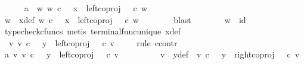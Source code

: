 \begin{isabellebody}
\ \ \ \ \isamarkupfalse%
\ a{}{\isacharcolon}{\kern0pt}\ {\isachardoublequoteopen}{\isasymexists}\ w{\isachardot}{\kern0pt}\ w\ {\isasymin}\isactrlsub c\ {\isasymone}\ {\isasymand}\ x\ {\isacharequal}{\kern0pt}\ left{\isacharunderscore}{\kern0pt}coproj\ {\isasymone}\ {\isasymone}\ {\isasymcirc}\isactrlsub c\ w{\isachardoublequoteclose}\isanewline
\ \ \ \ \isamarkupfalse%
\ \isamarkupfalse%
\ w\ \ x{\isacharunderscore}{\kern0pt}def{\isacharcolon}{\kern0pt}\ {\isachardoublequoteopen}w\ {\isasymin}\isactrlsub c\ {\isasymone}\ {\isasymand}\ x\ {\isacharequal}{\kern0pt}\ left{\isacharunderscore}{\kern0pt}coproj\ {\isasymone}\ {\isasymone}\ {\isasymcirc}\isactrlsub c\ w{\isachardoublequoteclose}\isanewline
\ \ \ \ \ \ \isamarkupfalse%
\ blast\isanewline
\ \ \ \ \isamarkupfalse%
\ \isamarkupfalse%
\ {\isachardoublequoteopen}w\ {\isacharequal}{\kern0pt}\ id\ {\isasymone}{\isachardoublequoteclose}\isanewline
\ \ \ \ \ \ \isamarkupfalse%
\ {\isacharparenleft}{\kern0pt}typecheck{\isacharunderscore}{\kern0pt}cfuncs{\isacharcomma}{\kern0pt}\ metis\ terminal{\isacharunderscore}{\kern0pt}func{\isacharunderscore}{\kern0pt}unique\ x{\isacharunderscore}{\kern0pt}def{\isacharparenright}{\kern0pt}\isanewline
\ \ \ \ \isamarkupfalse%
\ {\isachardoublequoteopen}{\isasymexists}\ v{\isachardot}{\kern0pt}\ v\ {\isasymin}\isactrlsub c\ {\isasymone}\ {\isasymand}\ y\ {\isacharequal}{\kern0pt}\ left{\isacharunderscore}{\kern0pt}coproj\ {\isasymone}\ {\isasymone}\ {\isasymcirc}\isactrlsub c\ v{\isachardoublequoteclose}\isanewline
\ \ \ \ \isamarkupfalse%
{\isacharparenleft}{\kern0pt}rule\ ccontr{\isacharparenright}{\kern0pt}\isanewline
\ \ \ \ \ \ \isamarkupfalse%
\ a{}{\isacharcolon}{\kern0pt}\ {\isachardoublequoteopen}{\isasymnexists}v{\isachardot}{\kern0pt}\ v\ {\isasymin}\isactrlsub c\ {\isasymone}\ {\isasymand}\ y\ {\isacharequal}{\kern0pt}\ left{\isacharunderscore}{\kern0pt}coproj\ {\isasymone}\ {\isasymone}\ {\isasymcirc}\isactrlsub c\ v{\isachardoublequoteclose}\isanewline
\ \ \ \ \ \ \isamarkupfalse%
\ \isamarkupfalse%
\ v\ \ y{\isacharunderscore}{\kern0pt}def{\isacharcolon}{\kern0pt}\ \ {\isachardoublequoteopen}v\ {\isasymin}\isactrlsub c\ {\isasymone}\ {\isasymand}\ y\ {\isacharequal}{\kern0pt}\ right{\isacharunderscore}{\kern0pt}coproj\ {\isasymone}\ {\isasymone}\ {\isasymcirc}\isactrlsub c\ v{\isachardoublequoteclose}\isanewline

\end{isabellebody}

